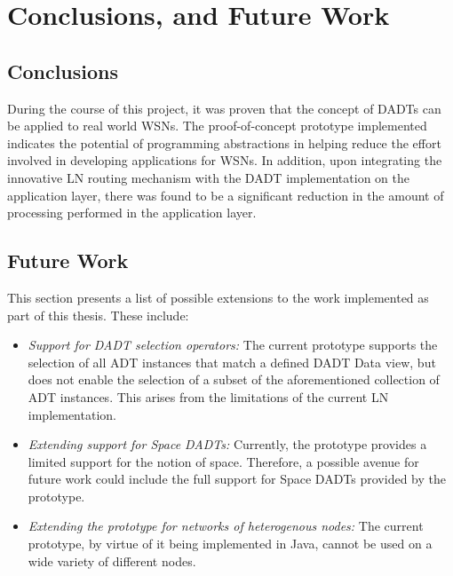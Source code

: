 \chapter{Conclusions, and Future Work} \label{chap:conclusions}
 \section{Conclusions}

During the course of this project, it was proven that the concept of DADTs can be
applied to real world WSNs. The proof-of-concept prototype implemented indicates
the potential of programming abstractions in helping reduce the effort involved
in developing applications for WSNs.
In addition, upon integrating the innovative LN routing mechanism
with the DADT implementation on the application layer, there was found to be a
significant reduction in the amount of processing performed in the application
layer. 
 
\section{Future Work}

This section presents a list of possible extensions to the work implemented as
part of this thesis. These include:

\begin{itemize}
  \item \emph{Support for DADT selection operators:} The current prototype
  supports the selection of all ADT instances that match a defined DADT Data
  view, but does not enable the selection of a subset of the aforementioned
  collection of ADT instances. This arises from the limitations of the current
  LN implementation.
  \item \emph{Extending support for Space DADTs:} Currently, the prototype
  provides a limited support for the notion of space. Therefore, a possible
  avenue for future work could include the full support for Space DADTs
  provided by the prototype.
  \item \emph{Extending the prototype for networks of heterogenous nodes:}
  The current prototype, by virtue of it being implemented in Java, cannot be
  used on a wide variety of different nodes. 
\end{itemize}

